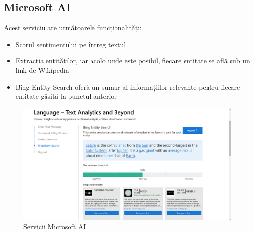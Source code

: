 \subsection{Microsoft AI}
{\noindent Acest serviciu are următoarele funcționalități:}
\begin{itemize}
    \setlength\itemsep{0.5em}
    \item Scorul sentimentului pe întreg textul
    \item Extracția entităților, iar acolo unde este posibil, fiecare entitate se află sub un link de Wikipedia
    \item Bing Entity Search oferă un sumar al informațiilor relevante pentru fiecare entitate găsită la punctul anterior
\end{itemize}
\begin{figure}[t]
	\centering
	\includegraphics[width=150mm]{figs/msDemo.png}
    \caption{Servicii Microsoft AI}
	\label{fig:msDemo}
\end{figure}
